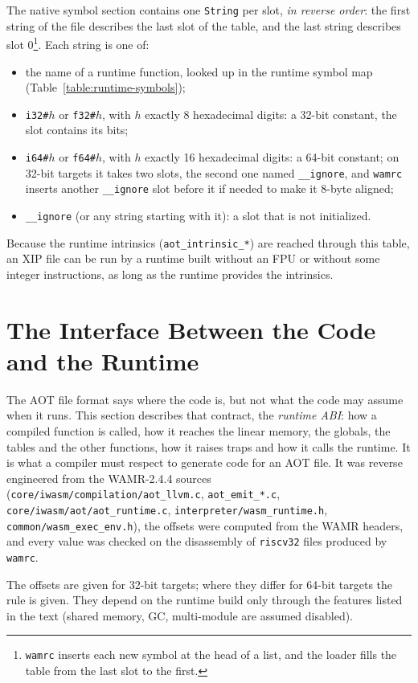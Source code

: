 \documentclass{article}
\begin{document}
The native symbol section contains one \verb|String| per slot, \emph{in reverse order}: the first string of the file describes the last slot of the table, and the last string describes slot 0\footnote{\texttt{wamrc} inserts each new symbol at the head of a list, and the loader fills the table from the last slot to the first.}.
Each string is one of:
\begin{itemize}
    \item the name of a runtime function, looked up in the runtime symbol map (Table~\ref{table:runtime-symbols});
    \item \verb|i32#|$h$ or \verb|f32#|$h$, with $h$ exactly 8 hexadecimal digits: a 32-bit constant, the slot contains its bits;
    \item \verb|i64#|$h$ or \verb|f64#|$h$, with $h$ exactly 16 hexadecimal digits: a 64-bit constant; on 32-bit targets it takes two slots, the second one named \verb|__ignore|, and \texttt{wamrc} inserts another \verb|__ignore| slot before it if needed to make it 8-byte aligned;
    \item \verb|__ignore| (or any string starting with it): a slot that is not initialized.
\end{itemize}
Because the runtime intrinsics (\verb|aot_intrinsic_*|) are reached through this table, an XIP file can be run by a runtime built without an FPU or without some integer instructions, as long as the runtime provides the intrinsics.

\section{The Interface Between the Code and the Runtime}
\label{sec:abi}
The AOT file format says where the code is, but not what the code may assume when it runs.
This section describes that contract, the \emph{runtime ABI}: how a compiled function is called, how it reaches the linear memory, the globals, the tables and the other functions, how it raises traps and how it calls the runtime.
It is what a compiler must respect to generate code for an AOT file.
It was reverse engineered from the WAMR-2.4.4 sources (\texttt{core/iwasm/compilation/aot\_llvm.c}, \texttt{aot\_emit\_*.c}, \texttt{core/iwasm/aot/aot\_runtime.c}, \texttt{interpreter/wasm\_runtime.h}, \texttt{common/wasm\_exec\_env.h}), the offsets were computed from the WAMR headers, and every value was checked on the disassembly of \texttt{riscv32} files produced by \texttt{wamrc}.

The offsets are given for 32-bit targets; where they differ for 64-bit targets the rule is given.
They depend on the runtime build only through the features listed in the text (shared memory, GC, multi-module are assumed disabled).
\end{document}
